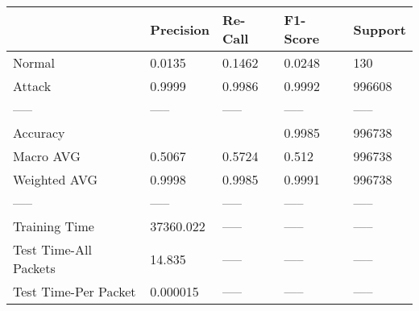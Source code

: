 \begin{tabular}{lllll}
\toprule
{} &  Precision & Re-Call & F1-Score & Support \\
\midrule
Normal                &     0.0135 &  0.1462 &   0.0248 &     130 \\
Attack                &     0.9999 &  0.9986 &   0.9992 &  996608 \\
-----                 &      ----- &   ----- &    ----- &   ----- \\
Accuracy              &            &         &   0.9985 &  996738 \\
Macro AVG             &     0.5067 &  0.5724 &    0.512 &  996738 \\
Weighted AVG          &     0.9998 &  0.9985 &   0.9991 &  996738 \\
-----                 &      ----- &   ----- &    ----- &   ----- \\
Training Time         &  37360.022 &   ----- &    ----- &   ----- \\
Test Time-All Packets &     14.835 &   ----- &    ----- &   ----- \\
Test Time-Per Packet  &   0.000015 &   ----- &    ----- &   ----- \\
\bottomrule
\end{tabular}

